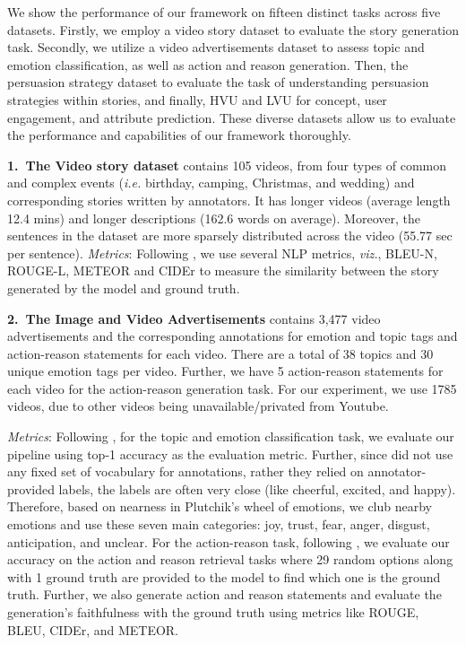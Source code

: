\documentclass[hidelinks,11pt,a4paper]{report}
\renewcommand{\cite}[1]{\citep{#1}}
\begin{document}
We show the performance of our framework on fifteen distinct tasks across five datasets. Firstly, we employ a video story dataset to evaluate the story generation task. Secondly, we utilize a video advertisements dataset to assess topic and emotion classification, as well as action and reason generation. Then, the persuasion strategy dataset to evaluate the task of understanding persuasion strategies within stories, and finally, HVU and LVU for concept, user engagement, and attribute prediction. These diverse datasets allow us to evaluate the performance and capabilities of our framework thoroughly.


\textbf{1.~The Video story dataset} \cite{Li_2020} contains 105 videos, from four types of common and complex events (\textit{i.e.} birthday, camping, Christmas, and wedding) and corresponding stories written by annotators. It has longer videos (average length 12.4 mins) and longer descriptions (162.6 words on average).
Moreover, the sentences in the dataset are more sparsely distributed across the video (55.77 sec per sentence).
\textit{Metrics}: Following \cite{Li_2020}, we use several NLP metrics, \textit{viz.}, BLEU-N, ROUGE-L, METEOR and CIDEr to measure the similarity between the story generated by the model and ground truth.


\textbf{2.~The Image and Video Advertisements} \cite{hussain2017automatic} contains 3,477 video advertisements and the corresponding annotations for emotion and topic tags and action-reason statements for each video. There are a total of 38 topics and 30 unique emotion tags per video. Further, we have 5 action-reason statements for each video for the action-reason generation task. For our experiment, we use 1785 videos, due to other videos being unavailable/privated from Youtube.

\textit{Metrics}: Following \cite{hussain2017automatic}, for the topic and emotion classification task, we evaluate our pipeline using top-1 accuracy as the evaluation metric. Further, since \cite{hussain2017automatic} did not use any fixed set of vocabulary for annotations, rather they relied on annotator-provided labels, the labels are often very close (like cheerful, excited, and happy). Therefore, based on nearness in Plutchik's \cite{PLUTCHIK19803} wheel of emotions, we club nearby emotions and use these seven main categories: joy, trust, fear, anger, disgust, anticipation, and unclear. For the action-reason task, following \cite{hussain2017automatic}, we evaluate our accuracy on the action and reason retrieval tasks where 29 random options along with 1 ground truth are provided to the model to find which one is the ground truth. Further, we also generate action and reason statements and evaluate the generation's faithfulness with the ground truth using metrics like ROUGE, BLEU, CIDEr, and METEOR.
\end{document}
